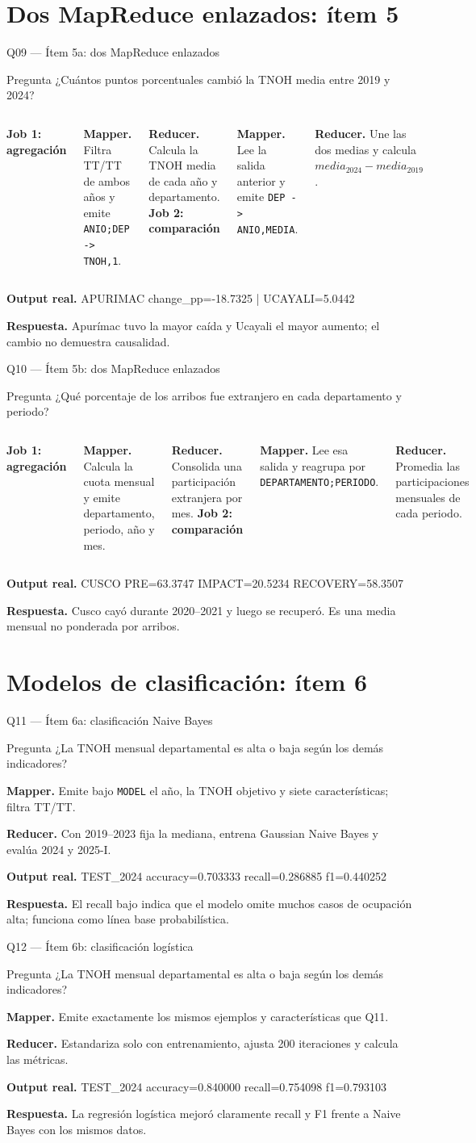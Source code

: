 \documentclass{beamer}
\newcommand{\queryframe}[6]{%
\begin{frame}{#1}
\footnotesize
\begin{alertblock}{Pregunta}
#2
\end{alertblock}
\textbf{Mapper.} #3

\vspace{0.45em}
\textbf{Reducer.} #4

\vspace{0.45em}
\textbf{Output real.} {\ttfamily\scriptsize #5}

\vspace{0.45em}
\textbf{Respuesta.} #6
\end{frame}
}
\newcommand{\dualqueryframe}[8]{%
\begin{frame}{#1}
\footnotesize
\begin{alertblock}{Pregunta}
#2
\end{alertblock}
\begin{columns}[T,onlytextwidth]
\column{0.49\textwidth}
\centering\textbf{Job 1: agregación}\par
\raggedright
\textbf{Mapper.} #3

\vspace{0.35em}
\textbf{Reducer.} #4
\column{0.49\textwidth}
\centering\textbf{Job 2: comparación}\par
\raggedright
\textbf{Mapper.} #5

\vspace{0.35em}
\textbf{Reducer.} #6
\end{columns}
\vspace{0.45em}
\textbf{Output real.} {\ttfamily\scriptsize #7}

\vspace{0.35em}
\textbf{Respuesta.} #8
\end{frame}
}
\begin{document}
\section{Dos MapReduce enlazados: ítem 5}

\dualqueryframe{Q09 — Ítem 5a: dos MapReduce enlazados}
{¿Cuántos puntos porcentuales cambió la TNOH media entre 2019 y 2024?}
{Filtra TT/TT de ambos años y emite \texttt{ANIO;DEP -> TNOH,1}.}
{Calcula la TNOH media de cada año y departamento.}
{Lee la salida anterior y emite \texttt{DEP -> ANIO,MEDIA}.}
{Une las dos medias y calcula $media_{2024}-media_{2019}$.}
{APURIMAC change\_pp=-18.7325 | UCAYALI=5.0442}
{Apurímac tuvo la mayor caída y Ucayali el mayor aumento; el cambio no demuestra causalidad.}

\dualqueryframe{Q10 — Ítem 5b: dos MapReduce enlazados}
{¿Qué porcentaje de los arribos fue extranjero en cada departamento y periodo?}
{Calcula la cuota mensual y emite departamento, periodo, año y mes.}
{Consolida una participación extranjera por mes.}
{Lee esa salida y reagrupa por \texttt{DEPARTAMENTO;PERIODO}.}
{Promedia las participaciones mensuales de cada periodo.}
{CUSCO PRE=63.3747 IMPACT=20.5234 RECOVERY=58.3507}
{Cusco cayó durante 2020--2021 y luego se recuperó. Es una media mensual no ponderada por arribos.}

\section{Modelos de clasificación: ítem 6}

\queryframe{Q11 — Ítem 6a: clasificación Naive Bayes}
{¿La TNOH mensual departamental es alta o baja según los demás indicadores?}
{Emite bajo \texttt{MODEL} el año, la TNOH objetivo y siete características; filtra TT/TT.}
{Con 2019--2023 fija la mediana, entrena Gaussian Naive Bayes y evalúa 2024 y 2025-I.}
{TEST\_2024 accuracy=0.703333 recall=0.286885 f1=0.440252}
{El recall bajo indica que el modelo omite muchos casos de ocupación alta; funciona como línea base probabilística.}

\queryframe{Q12 — Ítem 6b: clasificación logística}
{¿La TNOH mensual departamental es alta o baja según los demás indicadores?}
{Emite exactamente los mismos ejemplos y características que Q11.}
{Estandariza solo con entrenamiento, ajusta 200 iteraciones y calcula las métricas.}
{TEST\_2024 accuracy=0.840000 recall=0.754098 f1=0.793103}
{La regresión logística mejoró claramente recall y F1 frente a Naive Bayes con los mismos datos.}
\end{document}
